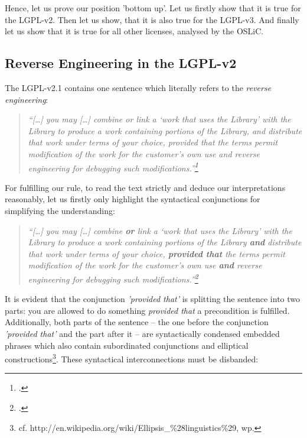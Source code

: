 Hence, let us prove our position 'bottom up'. Let us firstly show that it is
true for the LGPL-v2. Then let us show, that it is also true for the LGPL-v3.
And finally let us show that it is true for all other licenses, analysed by the
OSLiC.

\subsection{Reverse Engineering in the LGPL-v2}
The LGPL-v2.1 contains one sentence which literally refers to the
\emph{reverse engineering}:

\begin{quote}\noindent\emph{\enquote{[\ldots] you may [\ldots] combine or link a
\enquote{work that uses the Library} with the Library to produce a work
containing portions of the Library, and distribute that work under terms of your
choice, provided that the terms permit modification of the work for the
customer's own use and \emph{reverse engineering} for debugging such
modifications.}\footcite[cf.][\nopage wp]{Lgpl21OsiLicense1999a}}
\end{quote}

For fulfilling our rule, to read the text strictly and deduce our
interpretations reasonably, let us firstly only highlight the syntactical
conjunctions for simplifying the understanding:

\begin{quote}\noindent\emph{\enquote{[\ldots] you may [\ldots] combine
\textbf{or} link a \enquote{work that uses the Library} with the Library to
produce a work containing portions of the Library \textbf{and} distribute that
work under terms of your choice, \textbf{provided that} the terms permit
modification of the work for the customer's own use \textbf{and} \emph{reverse
engineering} for debugging such modifications.}\footcite[cf.][\nopage wp. herv.
KR.]{Lgpl21OsiLicense1999a}}
\end{quote}

It is evident that the conjunction \emph{'provided that'} is splitting the
sentence into two parts: you are allowed to do something \emph{provided that} a
precondition is fulfilled. Additionally, both parts of the sentence --
the one before the conjunction \emph{'provided that'} and the part after it --
are syntactically condensed embedded phrases which also contain subordinated 
conjunctions and elliptical constructions\footnote{cf.
http://en.wikipedia.org/wiki/Ellipsis\_\%28linguistics\%29, wp.
}. These syntactical interconnections must be disbanded:


